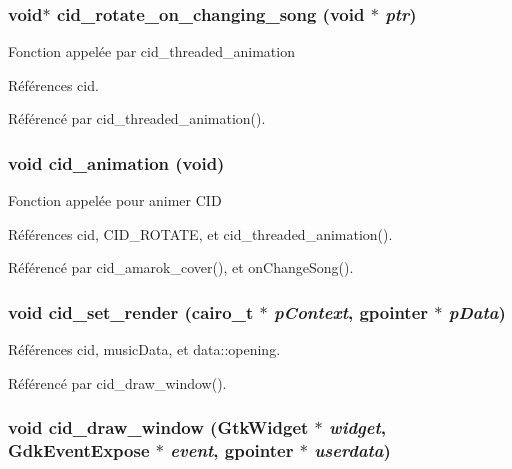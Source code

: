 \subsubsection{\setlength{\rightskip}{0pt plus 5cm}void$\ast$ cid\_\-rotate\_\-on\_\-changing\_\-song (void $\ast$ {\em ptr})}\label{cid-main_8c_f16aea4bb7c83bdd621e61e2b2d73845}


Fonction appelée par cid\_\-threaded\_\-animation 

Références cid.

Référencé par cid\_\-threaded\_\-animation().
\subsubsection{\setlength{\rightskip}{0pt plus 5cm}void cid\_\-animation (void)}\label{cid-main_8c_91ad784513daa5eaf6e6216cc4da9f5e}


Fonction appelée pour animer CID 

Références cid, CID\_\-ROTATE, et cid\_\-threaded\_\-animation().

Référencé par cid\_\-amarok\_\-cover(), et onChangeSong().
\subsubsection{\setlength{\rightskip}{0pt plus 5cm}void cid\_\-set\_\-render (cairo\_\-t $\ast$ {\em pContext}, \/  gpointer $\ast$ {\em pData})}\label{cid-main_8c_be8970a5ec7dc69031d81bdc0e145f17}




Références cid, musicData, et data::opening.

Référencé par cid\_\-draw\_\-window().
\subsubsection{\setlength{\rightskip}{0pt plus 5cm}void cid\_\-draw\_\-window (GtkWidget $\ast$ {\em widget}, \/  GdkEventExpose $\ast$ {\em event}, \/  gpointer $\ast$ {\em userdata})}\label{cid-main_8c_b82b0b11180b54f72365ab3208da944f}


